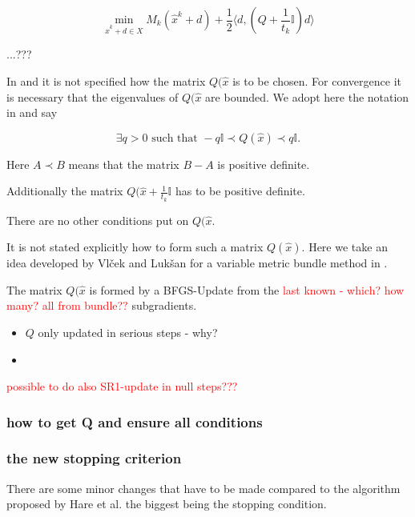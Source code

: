 \begin{equation}
	\min_{\hat{x}^k+d \in X} M_k(\hat{x}^k+d) + \frac{1}{2}\langle d,\left(Q+\frac{1}{t_k}\mathbb{I} \right) d \rangle
\end{equation}

...???


In \cite{Noll2012} and \cite{Noll2013} it is not specified how the matrix \(Q(\hat{x}\) is to be chosen.
For convergence it is necessary that the eigenvalues of \(Q(\hat{x}\) are bounded. We adopt here the notation in \cite{Noll2013} and say

\begin{equation}
	\exists q > 0 \text{ such that } -q\mathbb{I} \prec Q(\hat{x}) \prec q\mathbb{I}.
\end{equation}

Here \(A \prec B \) means that the matrix \(B-A\) is positive definite.

Additionally the matrix \(Q(\hat{x}+\frac{1}{t_k}\mathbb{I}\) has to be positive definite.

There are no other conditions put on \(Q(\hat{x}\).

It is not stated explicitly how to form such a matrix \(Q(\hat{x})\). Here we take an idea developed by Vl\v{c}ek  and Luk\v{s}an for a variable metric bundle method in \cite{Vlcek2001}.

The matrix \(Q(\hat{x}\) is formed by a BFGS-Update from the \textcolor{red}{last known - which? how many? all from bundle??} subgradients.



\begin{itemize}
	\item \(Q\) only updated in serious steps - why?
	\item 
\end{itemize}


\textcolor{red}{possible to do also SR1-update in null steps???}

\subsubsection{how to get Q and ensure all conditions}

\subsubsection{the new stopping criterion}

There are some minor changes that have to be made compared to the algorithm proposed by Hare et al. the biggest being the stopping condition.

